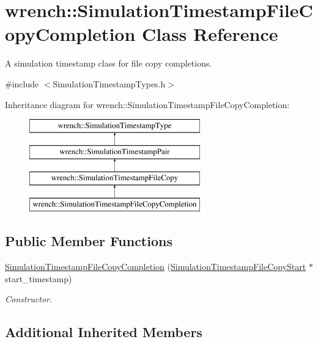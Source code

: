 \hypertarget{classwrench_1_1_simulation_timestamp_file_copy_completion}{}\section{wrench\+:\+:Simulation\+Timestamp\+File\+Copy\+Completion Class Reference}
\label{classwrench_1_1_simulation_timestamp_file_copy_completion}


A simulation timestamp class for file copy completions.  




{\ttfamily \#include $<$Simulation\+Timestamp\+Types.\+h$>$}

Inheritance diagram for wrench\+:\+:Simulation\+Timestamp\+File\+Copy\+Completion\+:\begin{figure}[H]
\begin{center}
\leavevmode
\includegraphics[height=4.000000cm]{classwrench_1_1_simulation_timestamp_file_copy_completion}
\end{center}
\end{figure}
\subsection*{Public Member Functions}
\begin{DoxyCompactItemize}
\item 
\hyperlink{classwrench_1_1_simulation_timestamp_file_copy_completion_ae5b37ee36fb0a78bb1e81bb8080c37d8}{Simulation\+Timestamp\+File\+Copy\+Completion} (\hyperlink{classwrench_1_1_simulation_timestamp_file_copy_start}{Simulation\+Timestamp\+File\+Copy\+Start} $\ast$start\+\_\+timestamp)
\begin{DoxyCompactList}\small\item\em Constructor. \end{DoxyCompactList}\end{DoxyCompactItemize}
\subsection*{Additional Inherited Members}


